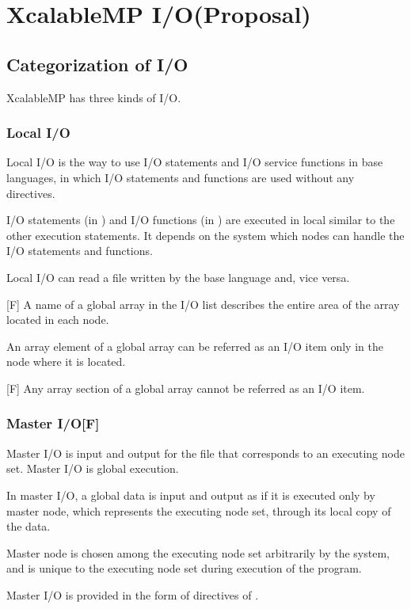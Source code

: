 
 \chapter{XcalableMP I/O(Proposal)}

 \section{Categorization of I/O}
 XcalableMP has three kinds of I/O.

  \subsection{Local I/O}

  Local I/O is the way to use I/O statements and I/O service functions in
  base languages, in which I/O statements and functions are used without
  any directives.

  I/O statements (in {\XMP} {\Fort}) and I/O functions (in {\XMP} {\C})
  are executed in local similar to the other execution statements.
  It depends on the system which nodes can handle the I/O statements and
  functions.

  Local I/O can read a file written by the base language and, vice
  versa.

  [F] A name of a global array in the I/O list describes the
  entire area of the array located in each node.

  An array element of a global array can be referred as an I/O item only
  in the node where it is located.

  [F] Any array section of a global array cannot be referred as an
  I/O item.

  \subsection{Master I/O[F]}

  Master I/O is input and output for the file that corresponds to an
  executing node set.
  Master I/O is global execution.

  In master I/O, a global data is input and output as if it is executed
  only by master node, which represents the executing node set, through
  its local copy of the data.

  Master node is chosen among the executing node set arbitrarily by the
  system, and is unique to the executing node set during execution of
  the program.

  Master I/O is provided in the form of directives of {\XMP} {\Fort}.

